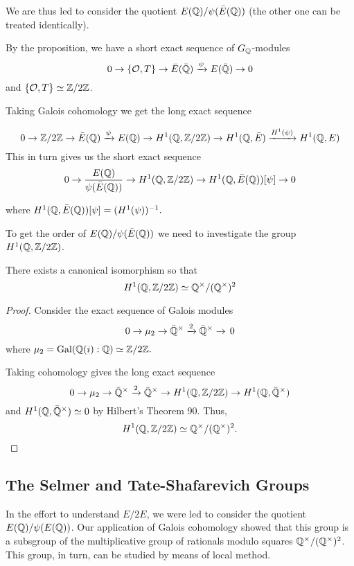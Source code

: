 \documentclass[12pt, a4paper]{amsart}
\begin{document}
We are thus led to consider the quotient $E({\mathbb Q}) / \psi(\bar{E}({\mathbb Q}))$ (the
other one can be treated identically).

By the proposition, we have a short exact sequence of $G_{{\mathbb Q}}$-modules
\[ 0 \rightarrow \{{\mathcal O}, T\} \rightarrow \bar{E}(\bar{{\mathbb Q}}) \xrightarrow[]{\psi}
  E(\bar{{\mathbb Q}})
  \rightarrow 0\]
and $\{{\mathcal O}, T\} \simeq {\mathbb Z}/2{\mathbb Z}$.

Taking Galois cohomology we get the long exact sequence

\[ 0 \rightarrow {\mathbb Z} / 2{\mathbb Z} \rightarrow \bar{E}({\mathbb Q}) \xrightarrow[]{\psi} E({\mathbb Q})
  \rightarrow H^1({\mathbb Q}, {\mathbb Z}/2{\mathbb Z}) \rightarrow H^1({\mathbb Q}, \bar{E}) \xrightarrow{H^1(\psi)}
  H^1({\mathbb Q}, E)\]
This in turn gives us the short exact sequence
\[ 0 \rightarrow \frac{E({\mathbb Q})}{\psi(\bar{E} ({\mathbb Q}))} \rightarrow
  H^1({\mathbb Q}, {\mathbb Z} / 2{\mathbb Z}) \rightarrow H^1({\mathbb Q}, \bar{E}({\mathbb Q}))[\psi] \rightarrow 0\]

where $H^1({\mathbb Q},\bar{E}({\mathbb Q}))[\psi] = (H^1(\psi))^{-1}.$ \vspace{3mm}

To get the order of $E({\mathbb Q}) / \psi(\bar{E}({\mathbb Q}))$ we need to investigate the group
$H^1({\mathbb Q}, {\mathbb Z}/2{\mathbb Z})$.

\begin{prop}
  There exists a canonical isomorphism so that
  \[H^1({\mathbb Q}, {\mathbb Z}/2{\mathbb Z}) \simeq {\mathbb Q}^{\times} / ({\mathbb Q}^{\times})^2\]
\end{prop}
\begin{proof}
Consider the exact sequence of Galois modules
\[0 \rightarrow \mu_2 \rightarrow \bar{{\mathbb Q}}^{\times} \xrightarrow[]{2} \bar{{\mathbb Q}}^{\times} \rightarrow
  \, 0 \]
where $\mu_2 = \text{Gal} ({\mathbb Q}(i) : {\mathbb Q}) \simeq {\mathbb Z} / 2{\mathbb Z}.$

Taking cohomology gives the long exact sequence
\[ 0 \rightarrow \mu_2 \rightarrow \bar{{\mathbb Q}}^{\times} \xrightarrow[]{2} \bar{{\mathbb Q}}^{\times} \rightarrow H^1({\mathbb Q}, {\mathbb Z}/2{\mathbb Z})
  \rightarrow H^1({\mathbb Q}, \bar{{\mathbb Q}}^{\times})\]
and $H^1({\mathbb Q}, \bar{{\mathbb Q}}^{\times}) \simeq 0$ by Hilbert's Theorem 90. Thus,
\[H^1({\mathbb Q}, {\mathbb Z}/2{\mathbb Z}) \simeq {\mathbb Q}^{\times}/({\mathbb Q}^{\times})^2. \]
\end{proof}

\subsection{The Selmer and Tate-Shafarevich Groups}

In the effort to understand $E/2E$, we were led to consider the quotient
$E({\mathbb Q}) / \psi(E({\mathbb Q}))$. Our application of Galois cohomology showed that this
group is a subsgroup of the multiplicative group of rationals modulo squares
${\mathbb Q}^{\times} / ({\mathbb Q}^{\times})^2$. This group, in turn, can be studied by means
of local method.
\end{document}
